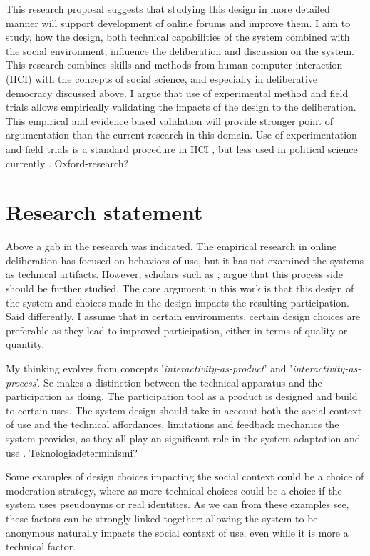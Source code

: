 \documentclass{article}
\begin{document}
This research proposal suggests that studying this design in more detailed manner will support development of online forums and improve them. I aim to study, how the design, both technical capabilities of the system combined with the social environment, influence the deliberation and discussion on the system. This research combines skills and methods from human-computer interaction (HCI) with the concepts of social science, and especially in deliberative democracy discussed above. I argue that use of experimental method and field trials allows empirically validating the impacts of the design to the deliberation. This empirical and evidence based validation will provide stronger point of argumentation than the current research in this domain. Use of experimentation and field trials is a standard procedure in HCI , but less used in political science currently . Oxford-research?

\section{Research statement}

Above a gab in the research was indicated. The empirical research in online deliberation has focused on behaviors of use, but it has not examined the systems as technical artifacts. However, scholars such as , argue that this process side should be further studied. The core argument in this work is that this design of the system and choices made in the design impacts the resulting participation. Said differently, I assume that in certain environments, certain design choices are preferable as they lead to improved participation, either in terms of quality or quantity.

My thinking evolves from  concepts '\textit{interactivity-as-product}' and '\textit{interactivity-as-process}'. Se makes a distinction between the technical apparatus and the participation as doing. The participation tool as a product is designed and build to certain uses. The system design should take in account both the social context of use and the technical affordances, limitations and feedback mechanics the system provides, as they all play an significant role in the system adaptation and use . Teknologiadeterminismi?

Some examples of design choices impacting the social context could be a choice of moderation strategy, where as more technical choices could be a choice if the system uses pseudonyms or real identities. As we can from these examples see, these factors can be strongly linked together: allowing the system to be anonymous naturally impacts the social context of use, even while it is more a technical factor.
\end{document}
